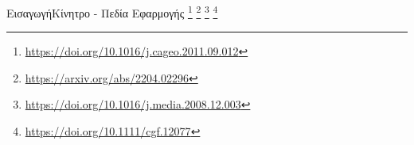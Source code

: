 \documentclass[10pt]{beamer}
\begin{document}
\begin{frame}{Eισαγωγή}{Κίνητρο - Πεδία Εφαρμογής}
\let\thefootnote\relax\footnote{\href{https://doi.org/10.1016/j.cageo.2011.09.012}{https://doi.org/10.1016/j.cageo.2011.09.012}}
\let\thefootnote\relax\footnote{\href{https://arxiv.org/abs/2204.02296}{https://arxiv.org/abs/2204.02296}}
\let\thefootnote\relax\footnote{\href{https://doi.org/10.1016/j.media.2008.12.003}{https://doi.org/10.1016/j.media.2008.12.003}}
\let\thefootnote\relax\footnote{\href{ https://doi.org/10.1111/cgf.12077}{ https://doi.org/10.1111/cgf.12077}}
\end{frame}
    
\end{document}
